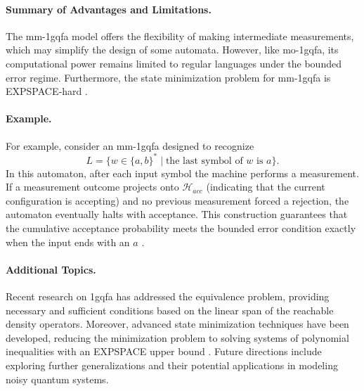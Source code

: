 \paragraph{Summary of Advantages and Limitations.}  
The \gls{mm-1gqfa} model offers the flexibility of making intermediate measurements, which may simplify the design of some automata. However, like \gls{mo-1gqfa}, its computational power remains limited to regular languages under the bounded error regime. Furthermore, the state minimization problem for \gls{mm-1gqfa} is EXPSPACE‐hard \cite{mateus2012complexity}.

\paragraph{Example.}  
For example, consider an \gls{mm-1gqfa} designed to recognize 
\[
L=\{w\in\{a,b\}^* \mid \text{the last symbol of }w\text{ is }a\}.
\]
In this automaton, after each input symbol the machine performs a measurement. If a measurement outcome projects onto $\mathcal{H}_{acc}$ (indicating that the current configuration is accepting) and no previous measurement forced a rejection, the automaton eventually halts with acceptance. This construction guarantees that the cumulative acceptance probability meets the bounded error condition exactly when the input ends with an $a$ \cite{li2012characterizations}.

\paragraph{Additional Topics.}  
Recent research on \gls{1gqfa} has addressed the equivalence problem, providing necessary and sufficient conditions based on the linear span of the reachable density operators. Moreover, advanced state minimization techniques have been developed, reducing the minimization problem to solving systems of polynomial inequalities with an EXPSPACE upper bound \cite{mercer2008lower}. Future directions include exploring further generalizations and their potential applications in modeling noisy quantum systems.



